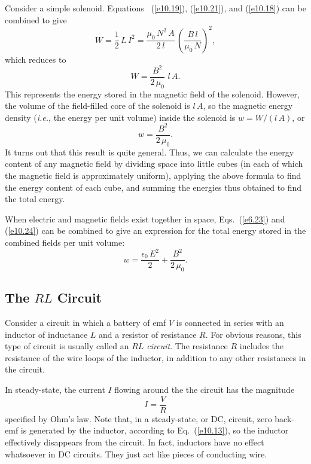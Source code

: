 Consider a simple solenoid.
Equations~ (\ref{e10.19}), (\ref{e10.21}),  and (\ref{e10.18}) can be combined to give
\begin{equation}
W = \frac{1}{2} \,L\,I^2 =\frac{\mu_0\,N^2\,A}{2\,l} \,\left(\frac{B\,l}{\mu_0\,N}
\right)^2,
\end{equation}
which reduces to
\begin{equation}
W = \frac{B^2}{2\,\mu_0} \,\,l\,A.
\end{equation}
This represents the energy stored in the magnetic field of the solenoid. 
However, the volume of the field-filled core of the solenoid is $l\,A$, so the magnetic
energy density ({\em i.e.}, the energy per unit volume) inside the
solenoid is $w = W/(l\,A)$, or
\begin{equation}\label{e10.24}
w = \frac{B^2}{2\,\mu_0}.
\end{equation}
It turns out that this result is quite general. Thus, we can calculate the
energy content of any magnetic field by dividing space into little cubes
(in each of which the magnetic field is approximately uniform), applying the
above formula to find the energy content of each cube, and summing
the energies thus obtained to find the total energy. 

When electric and magnetic fields exist together in space, Eqs.~(\ref{e6.23}) and
(\ref{e10.24}) can be combined to give an expression for
the total energy stored in the combined
fields per unit volume:
\begin{equation}
w = \frac{\epsilon_0\,E^2}{2} + \frac{B^2}{2\,\mu_0}.
\end{equation}

\subsection{The $RL$ Circuit}
Consider a circuit in which a battery of emf $V$ is connected in series
with an inductor of inductance $L$ and a resistor of resistance $R$.
For obvious reasons, this type of circuit
 is usually called an {\em $RL$ circuit}. The resistance $R$ includes the 
resistance of the wire loops
of the inductor, in addition to any other resistances in the circuit. 

In steady-state, the current $I$ flowing around the the circuit  has the magnitude
\begin{equation}
I = \frac{V}{R}
\end{equation}
specified by Ohm's law. Note that, in a steady-state, or DC, circuit,
zero  back-emf is generated by the inductor, according to Eq.~(\ref{e10.13}),
so the inductor effectively
disappears from the circuit. In fact, inductors have no effect whatsoever
 in DC circuits.
They just act like pieces of conducting wire. 

